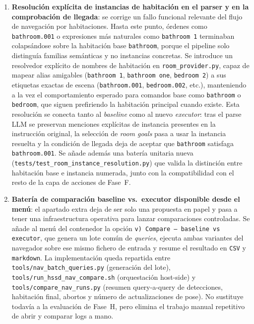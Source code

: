 \begin{enumerate}
  \item \textbf{Resolución explícita de instancias de habitación en el parser y
        en la comprobación de llegada}: se corrige un fallo funcional relevante
        del flujo de navegación por habitaciones. Hasta este punto, órdenes como
        \texttt{bathroom.001} o expresiones más naturales como
        \texttt{bathroom 1} terminaban colapsándose sobre la habitación base
        \texttt{bathroom}, porque el pipeline solo distinguía familias
        semánticas y no instancias concretas. Se introduce un resolvedor
        explícito de nombres de habitación en \texttt{room\_provider.py}, capaz
        de mapear alias amigables
        (\texttt{bathroom 1}, \texttt{bathroom one}, \texttt{bedroom 2}) a sus
        etiquetas exactas de escena (\texttt{bathroom.001},
        \texttt{bedroom.002}, etc.), manteniendo a la vez el comportamiento
        esperado para comandos base como \texttt{bathroom} o \texttt{bedroom},
        que siguen prefiriendo la habitación principal cuando existe. Esta
        resolución se conecta tanto al \emph{baseline} como al nuevo
        \emph{executor}: tras el parse LLM se preservan menciones explícitas de
        instancia presentes en la instrucción original, la selección de
        \emph{room goals} pasa a usar la instancia resuelta y la condición de
        llegada deja de aceptar que \texttt{bathroom} satisfaga
        \texttt{bathroom.001}. Se añade además una batería unitaria nueva
        (\texttt{tests/test\_room\_instance\_resolution.py}) que valida la
        distinción entre habitación base e instancia numerada, junto con la
        compatibilidad con el resto de la capa de acciones de Fase~F.

  \item \textbf{Batería de comparación baseline vs.\ executor disponible desde
        el menú}: el apartado extra deja de ser solo una propuesta en papel y
        pasa a tener una infraestructura operativa para lanzar comparaciones
        controladas. Se añade al menú del contenedor la opción
        \texttt{v) Compare --- baseline vs executor}, que genera un lote común
        de \emph{queries}, ejecuta ambas variantes del navegador sobre ese mismo
        fichero de entrada y resume el resultado en \texttt{CSV} y
        \texttt{markdown}. La implementación queda repartida entre
        \texttt{tools/nav\_batch\_queries.py} (generación del lote),
        \texttt{tools/run\_hssd\_nav\_compare.sh} (orquestación host-side) y
        \texttt{tools/compare\_nav\_runs.py} (resumen query-a-query de
        detecciones, habitación final, abortos y número de actualizaciones de
        pose). No sustituye todavía a la evaluación de Fase~H, pero elimina el
        trabajo manual repetitivo de abrir y comparar logs a mano.


\end{enumerate}
